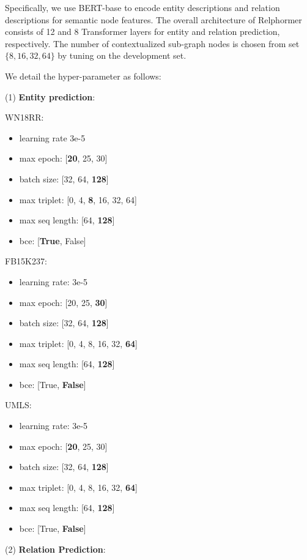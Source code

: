 \documentclass[sigconf]{acmart}
\begin{document}
Specifically, we use BERT-base to encode entity descriptions and relation descriptions for semantic node features.
The overall architecture of Relphormer consists of 12 and 8 Transformer layers for entity and relation prediction, respectively. 
The number of contextualized sub-graph nodes is chosen from set $\{8, 16, 32, 64\}$ by tuning on the development set. 

We detail the hyper-parameter as follows:

(1) \textbf{Entity prediction}:

WN18RR:
\begin{itemize}
\item learning rate 3e-5
\item max epoch: 
[\textbf{20}, 25, 30]
\item batch size: [32, 64, \textbf{128}]
\item max triplet: [0, 4, \textbf{8}, 16, 32, 64]
\item max seq length: [64, \textbf{128}]
\item bce: [\textbf{True}, False]
\end{itemize}

FB15K237:
\begin{itemize}
\item learning rate: 3e-5
\item max epoch: 
[20, 25, \textbf{30}]
\item batch size: [32, 64, \textbf{128}]
\item max triplet: [0, 4, 8, 16, 32, \textbf{64}]
\item max seq length: [64, \textbf{128}]
\item bce: [True, \textbf{False}]
\end{itemize}

UMLS:
\begin{itemize}
\item learning rate: 3e-5
\item max epoch: 
[\textbf{20}, 25, 30]
\item batch size: [32, 64, \textbf{128}]
\item max triplet: [0, 4, 8, 16, 32, \textbf{64}]
\item max seq length: [64, \textbf{128}]
\item bce: [True, \textbf{False}]
\end{itemize}
(2) \textbf{Relation Prediction}:
\end{document}
